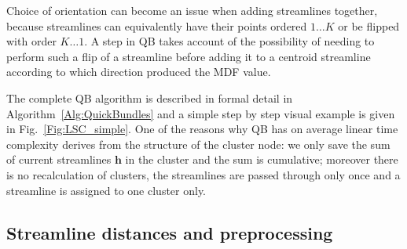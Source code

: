 \documentclass{bioinfo}
\begin{document}
\begin{methods}

Choice of orientation can become an issue when 
adding streamlines together, because 
streamlines
can equivalently have their points ordered $1 \dots K$ or be flipped with
order $K \dots 1$.
A step in QB takes account of the
possibility of needing to perform such a flip of a streamline before adding
it to a centroid streamline according to which direction produced
the MDF value.

The complete QB algorithm is described in formal detail in
Algorithm~\ref{Alg:QuickBundles} and a simple step by step visual
example is given in Fig.~\ref{Fig:LSC_simple}.  One of the reasons why
QB has on average linear time complexity derives from the structure of
the cluster node: we only save the sum of current streamlines
$\mathbf{h}$ in the cluster and the sum is cumulative; moreover there is
no recalculation of clusters, the streamlines are passed through only
once and a streamline is assigned to one cluster only.

\subsection{\label{sub:track-distances}Streamline distances and preprocessing}


\end{methods}
\end{document}
